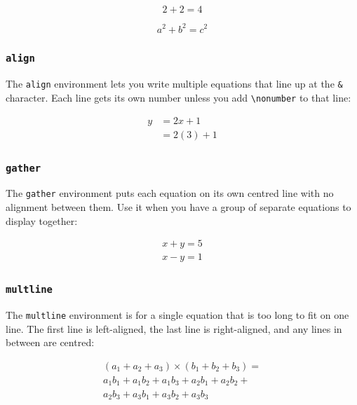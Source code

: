 		\begin{equation}
			2 + 2 = 4
			\label{eq:simple}
		\end{equation}
		
		\begin{equation}
			\boxed{a^2 + b^2 = c^2}
			\label{eq:pythagoras}
		\end{equation}
		
		\subsubsection{\texttt{align}}
		The \texttt{align} environment lets you write multiple equations that line up at the \texttt{\&} character. Each line gets its own number unless you add \texttt{\textbackslash nonumber} to that line:
		
		\begin{align}
			y &= 2x + 1 \\
			&= 2(3) + 1 \nonumber
		\end{align}
		
		\subsubsection{\texttt{gather}}
		The \texttt{gather} environment puts each equation on its own centred line with no alignment between them. Use it when you have a group of separate equations to display together:
		
		\begin{gather}
			x + y = 5 \\
			x - y = 1
		\end{gather}
		
		\subsubsection{\texttt{multline}}
		The \texttt{multline} environment is for a single equation that is too long to fit on one line. The first line is left-aligned, the last line is right-aligned, and any lines in between are centred:
		
		\begin{multline}
			(a_1 + a_2 + a_3) \times (b_1 + b_2 + b_3) = \\
			a_1 b_1 + a_1 b_2 + a_1 b_3 + a_2 b_1 + a_2 b_2 + \\
			a_2 b_3 + a_3 b_1 + a_3 b_2 + a_3 b_3
		\end{multline}
		

